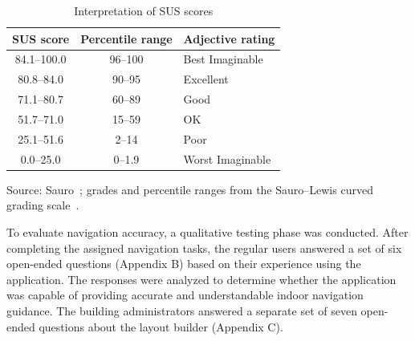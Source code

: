 \begin{table}[htbp]
\centering
\singlespacing
\caption{Interpretation of SUS scores}\label{tab:3.3}
\renewcommand{\arraystretch}{1.15}
\begin{tabular}{ccl}
\toprule
\textbf{SUS score} & \textbf{Percentile range} & \textbf{Adjective rating} \\
\midrule
84.1--100.0 & 96--100 & Best Imaginable \\
80.8--84.0 & 90--95 & Excellent \\
71.1--80.7 & 60--89 & Good \\
51.7--71.0 & 15--59 & OK \\
25.1--51.6 & 2--14 & Poor \\
0.0--25.0 & 0--1.9 & Worst Imaginable \\
\bottomrule
\end{tabular}
\par\vspace{4pt}
{\footnotesize\raggedright\setlength{\parindent}{0pt}Source: Sauro~\cite{ref23}; grades and percentile ranges from the Sauro--Lewis curved grading scale~\cite{ref21}.\par}
\end{table}

To evaluate navigation accuracy, a qualitative testing phase was conducted.
After completing the assigned navigation tasks, the regular users answered a set
of six open-ended questions (Appendix B) based on their experience using the
application. The responses were analyzed to determine whether the application
was capable of providing accurate and understandable indoor navigation guidance.
The building administrators answered a separate set of seven open-ended
questions about the layout builder (Appendix C).
